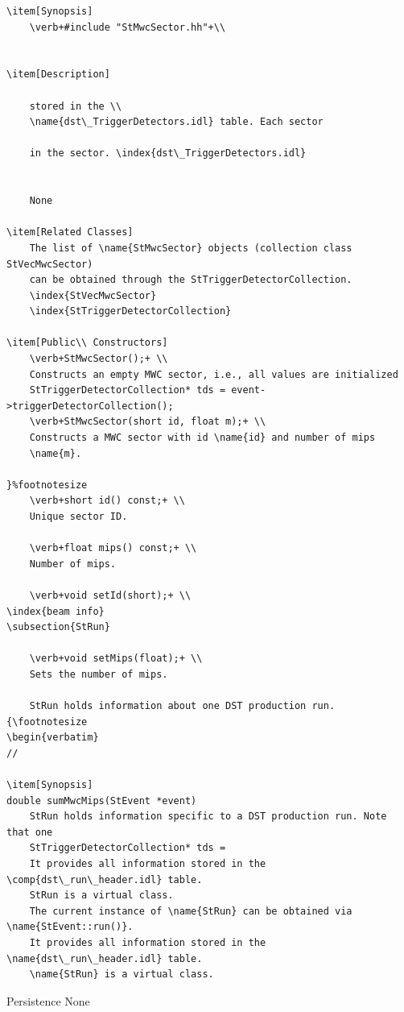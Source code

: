 \begin{Entry}
{\begin{verbatim}
\item[Synopsis]
    \verb+#include "StMwcSector.hh"+\\
    

\item[Description]
    
    stored in the \\
    \name{dst\_TriggerDetectors.idl} table. Each sector
    
    in the sector. \index{dst\_TriggerDetectors.idl}

   
    None

\item[Related Classes]
    The list of \name{StMwcSector} objects (collection class StVecMwcSector)
    can be obtained through the StTriggerDetectorCollection.
    \index{StVecMwcSector}
    \index{StTriggerDetectorCollection}
    
\item[Public\\ Constructors]
    \verb+StMwcSector();+ \\
    Constructs an empty MWC sector, i.e., all values are initialized
    StTriggerDetectorCollection* tds = event->triggerDetectorCollection();
    \verb+StMwcSector(short id, float m);+ \\
    Constructs a MWC sector with id \name{id} and number of mips
    \name{m}.

}%footnotesize    
    \verb+short id() const;+ \\
    Unique sector ID.

    \verb+float mips() const;+ \\
    Number of mips.

    \verb+void setId(short);+ \\
\index{beam info}
\subsection{StRun} 

    \verb+void setMips(float);+ \\
    Sets the number of mips.

    StRun holds information about one DST production run.
{\footnotesize
\begin{verbatim}
//
    
\item[Synopsis] 
double sumMwcMips(StEvent *event)
    StRun holds information specific to a DST production run. Note that one
    StTriggerDetectorCollection* tds =
    It provides all information stored in the \comp{dst\_run\_header.idl} table.
    StRun is a virtual class.
    The current instance of \name{StRun} can be obtained via \name{StEvent::run()}.
    It provides all information stored in the \name{dst\_run\_header.idl} table.
    \name{StRun} is a virtual class.
\end{verbatim}
}%
\item[Persistence]
    None


\end{Entry}
